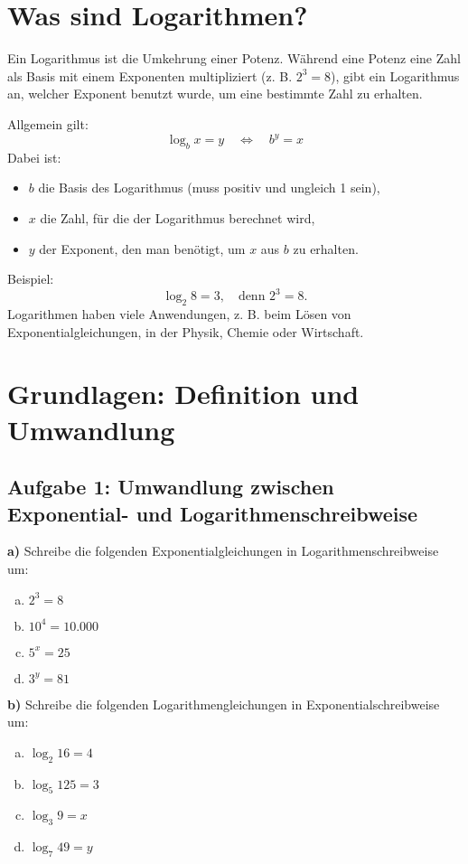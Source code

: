 \section{Was sind Logarithmen?}

Ein Logarithmus ist die Umkehrung einer Potenz. Während eine Potenz eine Zahl als Basis mit einem Exponenten multipliziert (z. B. \( 2^3 = 8 \)), gibt ein Logarithmus an, welcher Exponent benutzt wurde, um eine bestimmte Zahl zu erhalten.

Allgemein gilt:
\[
\log_b x = y \quad \Leftrightarrow \quad b^y = x
\]
Dabei ist:
\begin{itemize}
    \item \( b \) die Basis des Logarithmus (muss positiv und ungleich 1 sein),
    \item \( x \) die Zahl, für die der Logarithmus berechnet wird,
    \item \( y \) der Exponent, den man benötigt, um \( x \) aus \( b \) zu erhalten.
\end{itemize}

Beispiel:
\[
\log_2 8 = 3, \quad \text{denn } 2^3 = 8.
\]
Logarithmen haben viele Anwendungen, z. B. beim Lösen von Exponentialgleichungen, in der Physik, Chemie oder Wirtschaft.


\section{Grundlagen: Definition und Umwandlung}

\subsection*{Aufgabe 1: Umwandlung zwischen Exponential- und Logarithmenschreibweise}

\textbf{a)} Schreibe die folgenden Exponentialgleichungen in Logarithmenschreibweise um:

\begin{enumerate}[a)]
    \item \( 2^3 = 8 \)
    \item \( 10^4 = 10.000 \)
    \item \( 5^x = 25 \)
    \item \( 3^y = 81 \)
\end{enumerate}

\textbf{b)} Schreibe die folgenden Logarithmengleichungen in Exponentialschreibweise um:

\begin{enumerate}[a)]
    \item \( \log_2 16 = 4 \)
    \item \( \log_5 125 = 3 \)
    \item \( \log_3 9 = x \)
    \item \( \log_7 49 = y \)
\end{enumerate}

